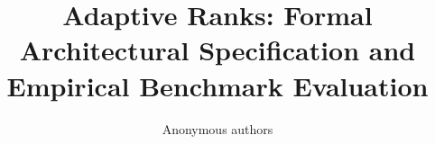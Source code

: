 \title{\textbf{Adaptive Ranks: Formal Architectural Specification and Empirical Benchmark Evaluation}}

\author{Anonymous authors}
